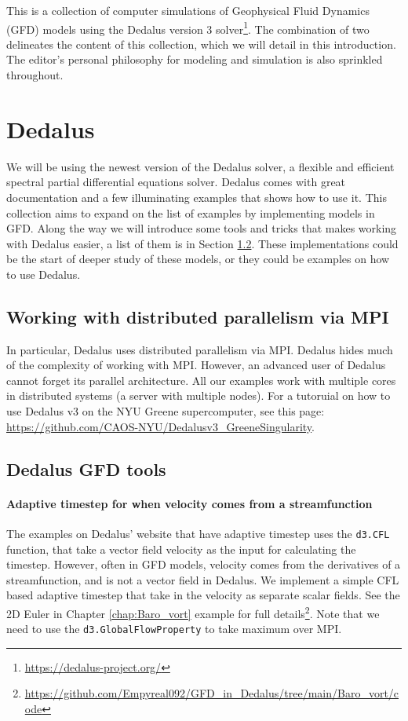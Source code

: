 This is a collection of computer simulations of Geophysical Fluid Dynamics (GFD) models using the Dedalus version 3 solver\footnote{\url{https://dedalus-project.org/}}. The combination of two delineates the content of this collection, which we will detail in this introduction. The editor's personal philosophy for modeling and simulation is also sprinkled throughout. 

\section{Dedalus}
We will be using the newest version of the Dedalus solver, a flexible and efficient spectral partial differential equations solver. Dedalus comes with great documentation and a few illuminating examples that shows how to use it. This collection aims to expand on the list of examples by implementing models in GFD. Along the way we will introduce some tools and tricks that makes working with Dedalus easier, a list of them is in Section \ref{sec:Ded_tools}. These implementations could be the start of deeper study of these models, or they could be examples on how to use Dedalus. 

\subsection{Working with distributed parallelism via MPI}
In particular, Dedalus uses distributed parallelism via MPI. Dedalus hides much of the complexity of working with MPI. However, an advanced user of Dedalus cannot forget its parallel architecture. All our examples work with multiple cores in distributed systems (a server with multiple nodes). For a tutoruial on how to use Dedalus v3 on the NYU Greene supercomputer, see this page: \url{https://github.com/CAOS-NYU/Dedalusv3_GreeneSingularity}.

\subsection{Dedalus GFD tools}\label{sec:Ded_tools}
\paragraph{Adaptive timestep for when velocity comes from a streamfunction}
The examples on Dedalus' website that have adaptive timestep uses the \texttt{d3.CFL} function, that take a vector field velocity as the input for calculating the timestep. However, often in GFD models, velocity comes from the derivatives of a streamfunction, and is not a vector field in Dedalus. We implement a simple CFL based adaptive timestep that take in the velocity as separate scalar fields. See the 2D Euler in Chapter \ref{chap:Baro_vort} example for full details\footnote{\url{https://github.com/Empyreal092/GFD_in_Dedalus/tree/main/Baro_vort/code}}. Note that we need to use the \texttt{d3.GlobalFlowProperty} to take maximum over MPI.

